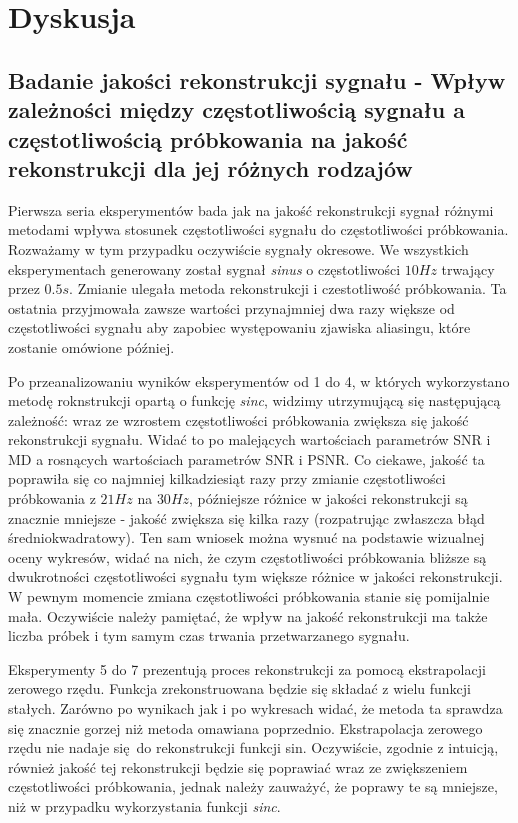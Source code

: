 \documentclass[12pt]{article}
\begin{document}
    \section{Dyskusja} {

        \subsection{Badanie jakości rekonstrukcji sygnału - Wpływ zależności między częstotliwością
        sygnału a częstotliwością próbkowania na jakość rekonstrukcji dla jej różnych rodzajów} {

            Pierwsza seria eksperymentów bada jak na jakość rekonstrukcji sygnał różnymi metodami wpływa
            stosunek częstotliwości sygnału do częstotliwości próbkowania. Rozważamy w tym przypadku oczywiście
            sygnały okresowe. We wszystkich eksperymentach generowany został sygnał \emph{sinus} o
            częstotliwości $10Hz$ trwający przez $0.5s$. Zmianie ulegała metoda rekonstrukcji i czestotliwość
            próbkowania. Ta ostatnia przyjmowała zawsze wartości przynajmniej dwa razy większe od częstotliwości
            sygnału aby zapobiec występowaniu zjawiska aliasingu, które zostanie omówione później.

            Po przeanalizowaniu wyników eksperymentów od 1 do 4, w których wykorzystano metodę roknstrukcji
            opartą o funkcję \emph{sinc}, widzimy utrzymującą się następującą zależność: wraz ze wzrostem
            częstotliwości próbkowania zwiększa się jakość rekonstrukcji sygnału. Widać to po malejących
            wartościach parametrów SNR i MD a rosnących wartościach parametrów SNR i PSNR. Co ciekawe, jakość ta
            poprawiła się co najmniej kilkadziesiąt razy przy zmianie częstotliwości próbkowania z $21Hz$ na
            $30Hz$, późniejsze różnice w jakości rekonstrukcji są znacznie mniejsze - jakość zwiększa się kilka
            razy (rozpatrując zwłaszcza błąd średniokwadratowy). Ten sam wniosek można wysnuć na podstawie
            wizualnej oceny wykresów, widać na nich, że czym częstotliwości próbkowania bliższe są dwukrotności
            częstotliwości sygnału tym większe różnice w jakości rekonstrukcji. W pewnym momencie zmiana
            częstotliwości próbkowania stanie się pomijalnie mała. Oczywiście należy pamiętać, że wpływ na
            jakość rekonstrukcji ma także liczba próbek i tym samym czas trwania przetwarzanego sygnału.

            Eksperymenty 5 do 7 prezentują proces rekonstrukcji za pomocą ekstrapolacji zerowego rzędu. Funkcja
            zrekonstruowana będzie się składać z wielu funkcji stałych. Zarówno po wynikach jak i po wykresach
            widać, że metoda ta sprawdza się znacznie gorzej niż metoda omawiana poprzednio. Ekstrapolacja
            zerowego rzędu nie nadaje się do rekonstrukcji funkcji sin. Oczywiście, zgodnie z intuicją, również
            jakość tej rekonstrukcji będzie się poprawiać wraz ze zwiększeniem częstotliwości próbkowania,
            jednak należy zauważyć, że poprawy te są mniejsze, niż w przypadku wykorzystania funkcji
            \emph{sinc}.

}}
\end{document}
